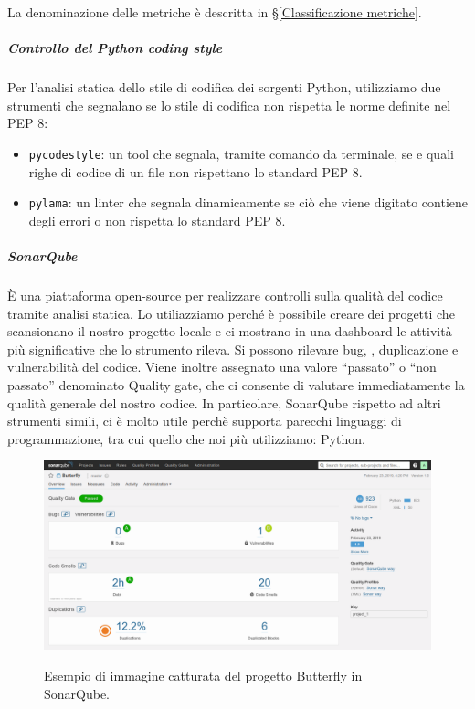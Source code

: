 			La denominazione delle metriche è descritta in \S\ref{Classificazione metriche}.

			\subparagraph{Controllo del Python coding style}\label{pycodestyle}
			Per l'analisi statica dello stile di codifica dei sorgenti Python, utilizziamo due strumenti che segnalano se lo stile di codifica non rispetta
			le norme definite nel PEP 8:
			\begin{itemize}
				\item \texttt{pycodestyle}: un tool che segnala, tramite comando da terminale, se e quali righe di codice di un file non rispettano lo standard PEP 8.
				\item \texttt{pylama}: un linter che segnala dinamicamente se ciò che viene digitato contiene degli errori o non rispetta
					lo standard PEP 8.
			\end{itemize}

			\subparagraph{SonarQube} \label{sonarqube}
			È una piattaforma open-source per realizzare controlli sulla qualità del codice tramite analisi statica.
			Lo utiliazziamo perché è possibile creare dei progetti che scansionano il nostro progetto locale e ci mostrano in una dashboard le attività più significative che lo strumento rileva.
			Si possono rilevare bug, , duplicazione e vulnerabilità del codice.
			Viene inoltre assegnato una valore ``passato'' o ``non passato'' denominato Quality gate, che ci consente di valutare immediatamente la qualità generale del nostro codice. 
			In particolare, SonarQube rispetto ad altri strumenti simili, ci è molto utile perchè supporta parecchi linguaggi di programmazione, tra cui quello che noi più utilizziamo: Python.

			\begin{figure}[H]
				\centering
				\includegraphics[width=\textwidth]{img/sonar.png}\\
				\caption[Screen SonarQube]{Esempio di immagine catturata del progetto Butterfly in SonarQube.}
				\label{fig:butterflySonar}
			\end{figure}

